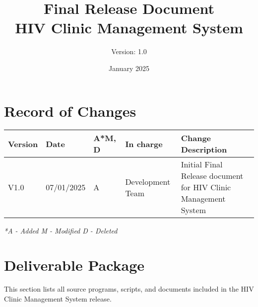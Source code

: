\documentclass[12pt,a4paper]{article}
\title{\textbf{Final Release Document\\HIV Clinic Management System}}
\author{Version: 1.0}
\date{January 2025}
\begin{document}
\maketitle
\thispagestyle{empty}

\newpage

\section*{Record of Changes}

\begin{longtable}{|p{2cm}|p{2cm}|p{1cm}|p{3cm}|p{6cm}|}
\hline
\textbf{Version} & \textbf{Date} & \textbf{A*M, D} & \textbf{In charge} & \textbf{Change Description} \\
\hline
V1.0 & 07/01/2025 & A & Development Team & Initial Final Release document for HIV Clinic Management System \\
\hline
\end{longtable}

\textit{*A - Added M - Modified D - Deleted}

\newpage

\tableofcontents

\newpage

\section{Deliverable Package}

This section lists all source programs, scripts, and documents included in the HIV Clinic Management System release.
\end{document}
